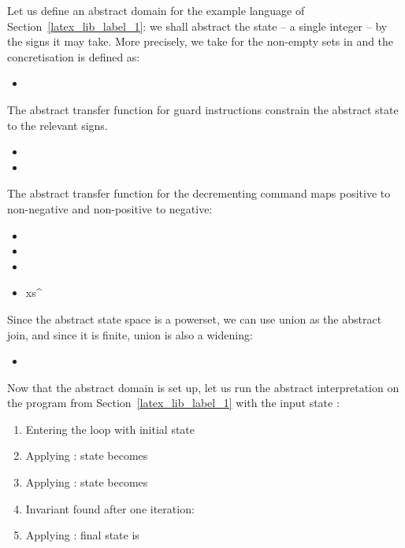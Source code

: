 \documentclass[]{llncs}
\begin{document}
\begin{example}
    Let us define an abstract domain for the example language of Section~\ref{latex_lib_label_1}: we shall abstract the state -- a single integer -- by the signs it may take. More precisely, we take for  the non-empty sets in  and the concretisation is defined as:
    \begin{itemize}
      \item 
    \end{itemize}
    The abstract transfer function for guard instructions constrain the abstract state to the relevant signs.
    \begin{itemize}
      \item 
      \item 
    \end{itemize}
    The abstract transfer function for the decrementing command maps positive to non-negative and non-positive to negative:
    \begin{itemize}
      \item 
      \item 
      \item 
      \item x{s}^{\sharp }
    \end{itemize}
    Since the abstract state space is a powerset, we can use union as the abstract join, and since it is finite, union is also a widening:
    \begin{itemize}
      \item 
    \end{itemize}
\par
Now that the abstract domain is set up, let us run the abstract interpretation on the program  from Section~\ref{latex_lib_label_1} with the input state :
    \begin{enumerate}
      \item Entering the loop with initial state 
      \item Applying : state becomes 
      \item Applying : state becomes 
      \item Invariant found after one iteration: 
      \item Applying : final state is 
    \end{enumerate}
  \end{example}
\par
\end{document}
